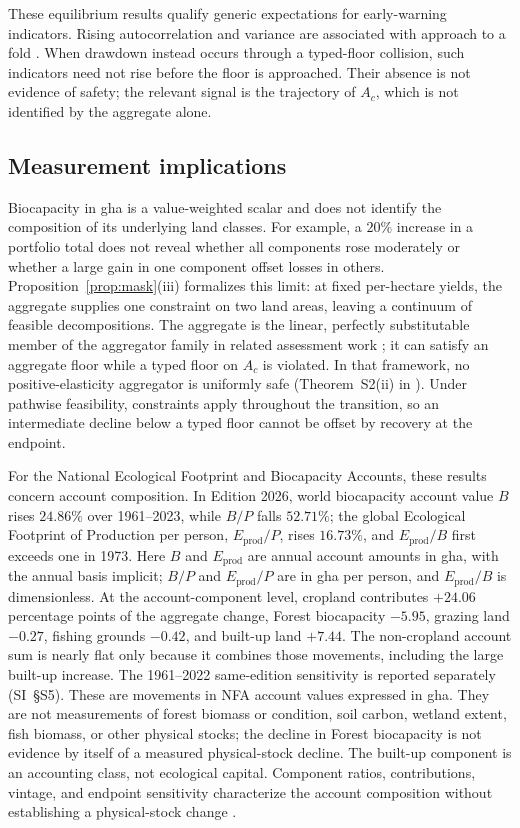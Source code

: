 \documentclass[preprint,12pt,authoryear]{elsarticle}
\begin{document}
These equilibrium results qualify generic expectations for early-warning indicators. Rising autocorrelation and variance are associated with approach to a fold \citep{Scheffer2001}. When drawdown instead occurs through a typed-floor collision, such indicators need not rise before the floor is approached. Their absence is not evidence of safety; the relevant signal is the trajectory of $A_c$, which is not identified by the aggregate alone.

\subsection{Measurement implications}

Biocapacity in gha is a value-weighted scalar and does not identify the composition of its underlying land classes. For example, a $20\%$ increase in a portfolio total does not reveal whether all components rose moderately or whether a large gain in one component offset losses in others. Proposition~\ref{prop:mask}(iii) formalizes this limit: at fixed per-hectare yields, the aggregate supplies one constraint on two land areas, leaving a continuum of feasible decompositions. The aggregate is the linear, perfectly substitutable member of the aggregator family in related assessment work \citep[Lemma~A of][]{Abaee2026b}; it can satisfy an aggregate floor while a typed floor on $A_c$ is violated. In that framework, no positive-elasticity aggregator is uniformly safe (Theorem~S2(ii) in \citet{Abaee2026b}). Under pathwise feasibility, constraints apply throughout the transition, so an intermediate decline below a typed floor cannot be offset by recovery at the endpoint.

For the National Ecological Footprint and Biocapacity Accounts, these results concern account composition. In Edition 2026, world biocapacity account value $B$ rises $24.86\%$ over 1961--2023, while $B/P$ falls $52.71\%$; the global Ecological Footprint of Production per person, $E_{\mathrm{prod}}/P$, rises $16.73\%$, and $E_{\mathrm{prod}}/B$ first exceeds one in 1973. Here $B$ and $E_{\mathrm{prod}}$ are annual account amounts in gha, with the annual basis implicit; $B/P$ and $E_{\mathrm{prod}}/P$ are in gha per person, and $E_{\mathrm{prod}}/B$ is dimensionless. At the account-component level, cropland contributes $+24.06$ percentage points of the aggregate change, Forest biocapacity $-5.95$, grazing land $-0.27$, fishing grounds $-0.42$, and built-up land $+7.44$. The non-cropland account sum is nearly flat only because it combines those movements, including the large built-up increase. The 1961--2022 same-edition sensitivity is reported separately (SI~\S S5). These are movements in NFA account values expressed in gha. They are not measurements of forest biomass or condition, soil carbon, wetland extent, fish biomass, or other physical stocks; the decline in Forest biocapacity is not evidence by itself of a measured physical-stock decline. The built-up component is an accounting class, not ecological capital. Component ratios, contributions, vintage, and endpoint sensitivity characterize the account composition without establishing a physical-stock change \citep{Lo2026NFA,Borucke2013,Blomqvist2013,GiampietroSaltelli2014,Galli2016,vdBerghGrazi2015}.
\end{document}
